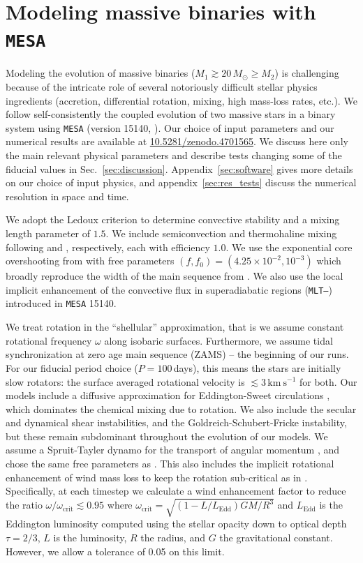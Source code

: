 \documentclass[twocolumn,twocolappendix,trackchanges]{aastex63}
\newcommand{\kms}{{\mathrm{km\ s^{-1}}}}
\DeclareRobustCommand{\Secref}[1]{Sec.~\ref{#1}}
\begin{document}
\section{Modeling massive binaries with \texttt{MESA}}
\label{sec:methods}

Modeling the evolution of massive binaries
($M_1\gtrsim 20\,M_\odot \geq M_2$) is challenging because of the
intricate role of several notoriously difficult stellar physics
ingredients (accretion, differential rotation, mixing, high mass-loss
rates, etc.). We follow self-consistently the coupled evolution
of two massive stars in a binary system using \texttt{MESA} (version
15140, \citealt{paxton:11, paxton:13, paxton:15, paxton:18,
  paxton:19}). Our choice of input parameters and our numerical
results are available at \url{10.5281/zenodo.4701565}. We discuss here
only the main relevant physical parameters and describe tests changing
some of the fiducial values in
\Secref{sec:discussion}. Appendix~\ref{sec:software} gives more
details on our choice of input physics, and
appendix~\ref{sec:res_tests} discuss the numerical resolution in space
and time.

We adopt the Ledoux criterion to determine convective stability and a
mixing length parameter of $1.5$. We include semiconvection and
thermohaline mixing following \cite{langer:83} and
\cite{kippenhahn:80}, respectively, each with efficiency $1.0$. We use the exponential core overshooting from \cite{herwig:00}
with free parameters $(f, f_0)=(4.25\times10^{-2}, 10^{-3})$
\citep{claret:17} which broadly reproduce the width of the main
sequence from \cite{brott:11}. We also use the local implicit
enhancement of the convective flux in superadiabatic regions
(\texttt{MLT--}) introduced in \texttt{MESA}
15140.

We treat rotation in the ``shellular'' approximation, that is we
assume constant rotational frequency $\omega$ along isobaric
surfaces. Furthermore, we assume tidal synchronization at zero age
main sequence (ZAMS) -- the beginning of our runs. For our fiducial
period choice ($P=100$\,days), this means the stars are initially slow
rotators: the surface averaged rotational velocity is
$\lesssim3\,\kms$ for both. Our models include a diffusive
approximation for Eddington-Sweet circulations \citep{sweet:50}, which
dominates the chemical mixing due to rotation. We also include the
secular and dynamical shear instabilities, and the
Goldreich-Schubert-Fricke instability, but these remain subdominant
throughout the evolution of our models.  We assume a Spruit-Tayler
dynamo for the transport of angular momentum \citep{spruit:02}, and
chose the same free parameters as \cite{heger:00}. This also includes
the implicit rotational enhancement of wind mass loss to keep the
rotation sub-critical as in \cite{langer:98}. Specifically, at each
timestep we calculate a wind enhancement factor to reduce the ratio
$\omega/\omega_\mathrm{crit}\lesssim 0.95$ where
$\omega_\mathrm{crit}=\sqrt{(1-L/L_\mathrm{Edd})GM/R^3}$ and
$L_\mathrm{Edd}$ is the Eddington luminosity computed using the
stellar opacity down to optical depth
$\tau=2/3$, $L$ is the luminosity, $R$ the radius, and $G$
the gravitational constant. However, we allow a tolerance of 0.05 on
this limit.
\end{document}
